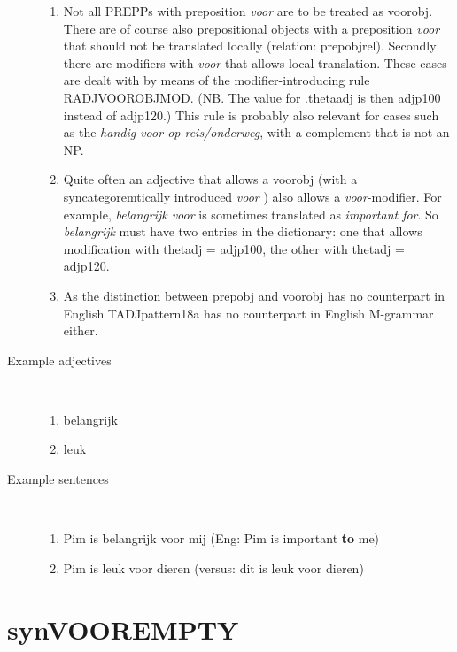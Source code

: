 \begin{description}
\begin{enumerate}
  \item 
Not all PREPPs with preposition {\em voor} are to be treated as voorobj.
There 
are of course  also prepositional objects with a preposition {\em voor} that
should not be translated locally (relation: prepobjrel). Secondly 
there are modifiers with {\em voor} that allows local translation. These cases 
are dealt with by means of the modifier-introducing rule RADJVOOROBJMOD. 
(NB.  The value for .thetaadj is then adjp100 instead of adjp120.)
This rule is probably also relevant for cases such as the
{\em handig voor op reis/onderweg}, with a complement that is not an NP.
  \item 
Quite often an adjective that allows a voorobj (with a syncategoremtically 
introduced {\em voor} ) also allows a {\em voor}-modifier. For example, 
{\em belangrijk voor} is sometimes translated as 
{\em important for}. So {\em belangrijk} must have two entries in the 
dictionary: one that allows modification with thetadj = adjp100, 
the other with thetadj = adjp120.
  \item As the distinction between prepobj and voorobj has no counterpart in 
English TADJpattern18a has no counterpart in English M-grammar either.
\end{enumerate}
  \item [Example adjectives]\mbox{}\\
\begin{enumerate}
  \item belangrijk
  \item leuk
\end{enumerate}
  \item [Example sentences]\mbox{}\\
\begin{enumerate}
  \item  Pim is belangrijk voor mij (Eng: Pim is important {\bf to} me)
  \item  Pim is leuk voor dieren (versus: dit is leuk voor dieren)
\end{enumerate}
\end{description}
\newpage
\section{synVOOREMPTY}
